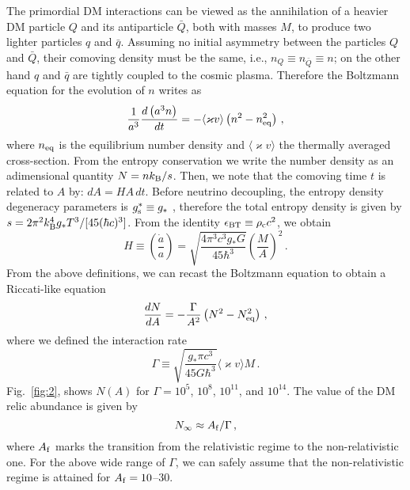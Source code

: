 \documentclass[twocolumn,showpacs, nofootinbib,aps,superscriptaddress, eqsecnum,prd,prl,notitlepage,showkeys,10pt,reprint]{revtex4-1}
\begin{document}
The primordial DM interactions can be viewed as the annihilation of a heavier DM particle $Q$ and its antiparticle $\bar{Q}$, both with masses $M$, to produce two lighter particles $q$ and $\bar{q}$.
Assuming no initial asymmetry between the particles $Q$ and $\bar{Q}$, their comoving density must be the same, i.e., $n_{Q}\equiv n_{\bar{Q}}\equiv n$; on the other hand $q$ and $\bar{q}$ are tightly coupled to the cosmic plasma.
Therefore the Boltzmann equation for the evolution of $n$ writes as
%
\begin{equation}
\label{NQ}
\frac{1}{a^3}\frac{d \left(a^3n\right)}{dt}=-\langle \varkappa v\rangle \left(n^2-n_{\rm eq}^2\right)\,,
\end{equation}
%
where $n_{\rm eq}$ is the equilibrium number density and $\langle \varkappa v\rangle$ the thermally averaged cross-section.
From the entropy conservation we write the number density as an adimensional quantity $N=n k_{\rm B}/s$.
Then, we note that the comoving time $t$ is related to $A$ by: $dA=HA\,dt$.
Before neutrino decoupling, the entropy density degeneracy parameters is $g_{\rm s}^{*}\equiv g_{*}$ \cite{2008cosm.book.....W}, therefore the total entropy density is given by $s=2\pi^2 k_{\rm B}^4 g_{*} T^3/[45(\hbar c)^3]$.
From the identity $\epsilon_{\rm BT}\equiv\rho_{\rm c}c^2$, we obtain
%
\begin{equation}
\label{NQ4}
H\equiv\left(\frac{\dot a}{a}\right)=\sqrt{\frac{4\pi^3c^3g_{*}G}{45\hbar^3}}\left(\frac{M}{A}\right)^2\,.
\end{equation}
%
From the above definitions, we can recast the Boltzmann equation to obtain a Riccati-like equation
%
\begin{equation}
\label{NQ3}
\frac{d N}{dA}=-\frac{\Gamma}{A^2}\left(N^2-N_{\rm eq}^2\right)\,,
\end{equation}
%
where we defined the interaction rate
%
\begin{equation}
\label{Gamma}
\Gamma\equiv \sqrt{\frac{g_{*}\pi c^3}{45G\hbar^3}} \langle\varkappa v\rangle M\,.
\end{equation}
%
Fig.~\ref{fig:2}, shows $N(A)$ for $\Gamma=10^5$, $10^8$, $10^{11}$, and $10^{14}$. The value of the DM relic abundance is given by
%
\begin{equation}
N_\infty\approx A_{\rm f}/\Gamma\,,
\end{equation}
%
where $A_{\rm f}$ marks the transition from the relativistic regime to the non-relativistic one.
For the above wide range of $\Gamma$, we can safely assume that the non-relativistic regime is attained for $A_{\rm f}=10$--$30$.
\end{document}
